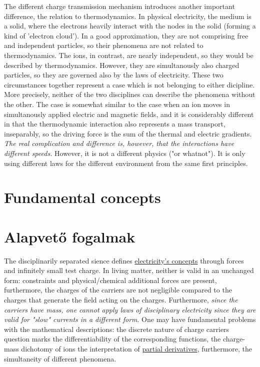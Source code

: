 \ifx\magyar\undefined
The different charge transmission mechanism introduces another important difference, the relation to thermodynamics.
In physical electricity, the medium is a solid, where the electrons heavily interact with the nodes in the solid (forming a kind of 'electron cloud'). In a good approximation, they are not comprising free and independent particles, so their phenomena are not related to thermodynamics. The ions, in contrast,
are nearly independent, so they would be described by thermodynamics.
However, they are simultanously also charged particles, so they are governed also by the laws of electricity. These two circumstances together represent a case which is not belonging to either dicipline.
More precisely, neither of the two disciplines can describe the
phenomena without the other.
The case is somewhat similar to the case when an ion moves in simultanously applied electric and magnetic fields,
and it is considerably different in that the thermodynamic interaction also represents a mass transport,
inseparably, so the driving force is the sum of the thermal and electric gradients.
\textit{The real complication and difference is, however, that the interactions have different speeds.}
However, it is not a different physics ("or whatnot").
It is only using different laws for the different environment
from the same first principles.

\else

\fi

\ifx\magyar\undefined 
\section[Concepts]{Fundamental concepts\label{sec:PHYSICS_ELECTRICFundamental}}  
\else
\section[Fogalmak]{Alapvető fogalmak\label{sec:PHYSICS_ELECTRICFundamental}}  

\fi


\ifx\magyar\undefined 
The disciplinarily separated sience defines \href{http://hyperphysics.phy-astr.gsu.edu/hbase/electric/elefie.html#c1}{electricity's concepts}
through forces and infinitely small test charge. In living matter,
neither is valid in an unchanged form: constraints and physical/chemical additional forces are present, furthermore, the charges of the carriers are not
negligible compared to the charges that generate the field acting on the charges. Furthermore, \textit{since the carriers have mass, 
one cannot apply laws of disciplinary electricity since they are valid for "slow" currents in a different form}. One may have fundamental problems with the mathematical descriptions: 
the discrete nature of charge carriers question marks the differentiability of the corresponding functions,  
the charge-mass dichotomy of ions the interpretation of 
\hyperlink{PartialDerivative}{partial derivatives}, furthermore, the simultaneity of different phenomena.
\else


